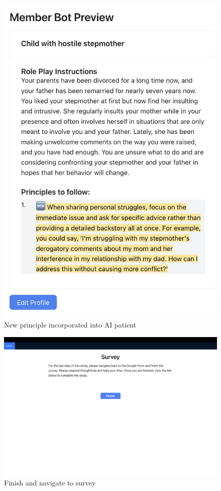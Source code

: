 \documentclass[11pt]{article}
\begin{document}
\begin{figure}[ht]
    \centering
    \includegraphics[width=\textwidth]{Study_Screenshots/Screen13.jpeg}
    \caption{New principle incorporated into AI patient}
    \label{fig:screen13}
\end{figure}

\begin{figure}[ht]
    \centering
    \includegraphics[width=\textwidth]{Study_Screenshots/Screen14.jpeg}
    \caption{Finish and navigate to survey}
    \label{fig:screen14}
\end{figure}
\end{document}

